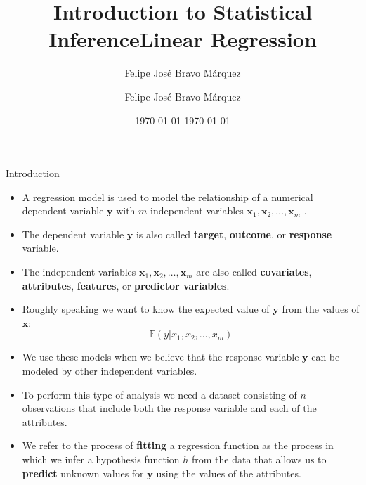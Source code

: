\documentclass[handout]{beamer}
\title{Introduction to Statistical Inference}
\author[Felipe Bravo Márquez]{\footnotesize
 \textcolor[rgb]{0.00,0.00,1.00}{Felipe José Bravo Márquez}}
\date{ \today }
\title{Linear Regression}
\author[Felipe Bravo Márquez]{\footnotesize
 \textcolor[rgb]{0.00,0.00,1.00}{Felipe José Bravo Márquez}}
\date{ \today }
\begin{document}
\begin{frame}
\titlepage


\end{frame}





\begin{frame}{Introduction}
\scriptsize{
\begin{itemize}

 \item  A regression model is used to model the relationship of a numerical dependent variable $\mathbf{y}$ with $m$ independent variables  $\mathbf{x}_1, \mathbf{x}_2, \dots, \mathbf{x}_m$ \cite{wasserman2013all}. 
 
 \item The dependent variable $\mathbf{y}$ is also called \textbf{target}, \textbf{outcome}, or \textbf{response} variable.
 
 \item The independent variables  $\mathbf{x}_1, \mathbf{x}_2, \dots, \mathbf{x}_m$ are also called \textbf{covariates}, \textbf{attributes}, \textbf{features}, or \textbf{predictor variables}.
 
 
 \item  Roughly speaking we want to know the expected value of $\mathbf{y}$ from the values of $\mathbf{x}$:
 \begin{displaymath}
 \mathbb{E}(y|x_1,x_2,\dots,x_m)
 \end{displaymath}

 
 \item  We use these models when we believe that the response variable $\mathbf{y}$ can be modeled by other independent variables.
 
 \item To perform this type of analysis we need a dataset consisting of $n$ observations that include both the response variable and each of the attributes.
 
 \item We refer to the process of \textbf{fitting} a regression function as the process in which we infer a hypothesis function $h$ from the data  that allows us to \textbf{predict} unknown values for $\mathbf{y}$ using the values of the attributes.

 
\end{itemize}



} 
 
\end{frame}
\end{document}
